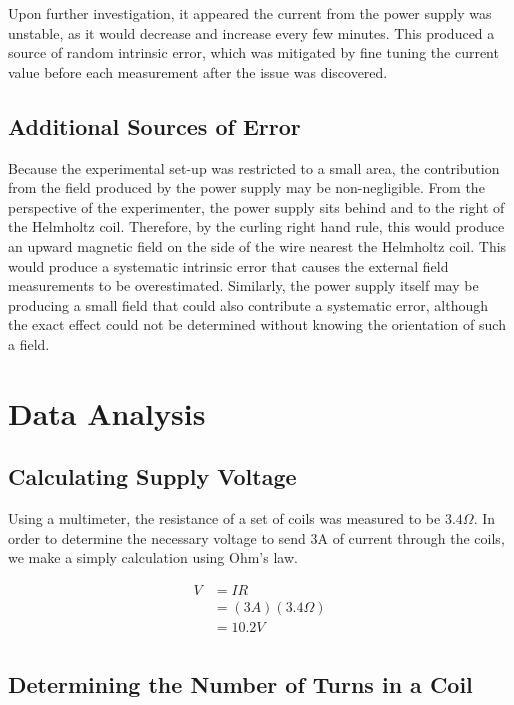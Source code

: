 \documentclass[a4paper]{article}
\begin{document}
Upon further investigation, it appeared the current from the power
supply was unstable, as it would decrease and increase every few
minutes. This produced a source of random intrinsic error, which was
mitigated by fine tuning the current value before each measurement
after the issue was discovered.

\subsection{Additional Sources of Error}

Because the experimental set-up was restricted to a small area, the
contribution from the field produced by the power supply may be
non-negligible. From the perspective of the experimenter, the power
supply sits behind and to the right of the Helmholtz coil. Therefore,
by the curling right hand rule, this would produce an upward magnetic
field on the side of the wire nearest the Helmholtz coil. This would
produce a systematic intrinsic error that causes the external field
measurements to be overestimated. Similarly, the power supply itself
may be producing a small field that could also contribute a systematic
error, although the exact effect could not be determined without
knowing the orientation of such a field.

\section{Data Analysis}


\subsection{Calculating Supply Voltage}

Using a multimeter, the resistance of a set of coils was measured to
be $3.4 \Omega$. In order to determine the necessary voltage to send
3A of current through the coils, we make a simply calculation using
Ohm's law.

\begin{align*}
V &= IR \\
  &= (3A)(3.4 \Omega) \\
  &= 10.2V \\
\end{align*}

\subsection{Determining the Number of Turns in a Coil}
\end{document}
